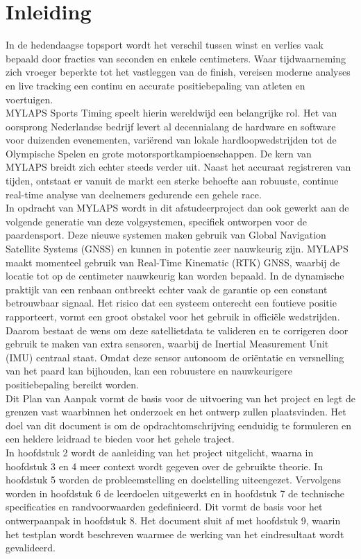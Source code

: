 
\section{Inleiding}
In de hedendaagse topsport wordt het verschil tussen winst en verlies vaak bepaald door fracties van seconden en enkele centimeters. Waar tijdwaarneming zich vroeger beperkte tot het vastleggen van de finish, vereisen moderne analyses en live tracking een continu en accurate positiebepaling van atleten en voertuigen. \\

MYLAPS Sports Timing speelt hierin wereldwijd een belangrijke rol. Het van oorsprong Nederlandse bedrijf levert al decennialang de hardware en software voor duizenden evenementen, variërend van lokale hardloopwedstrijden tot de Olympische Spelen en grote motorsportkampioenschappen. De kern van MYLAPS breidt zich echter steeds verder uit. Naast het accuraat registreren van tijden, ontstaat er vanuit de markt een sterke behoefte aan robuuste, continue real-time analyse van deelnemers gedurende een gehele race. \\

In opdracht van MYLAPS wordt in dit afstudeerproject dan ook gewerkt aan de volgende generatie van deze volgsystemen, specifiek ontworpen voor de paardensport. Deze nieuwe systemen maken gebruik van Global Navigation Satellite Systems (GNSS) en kunnen in potentie zeer nauwkeurig zijn. MYLAPS maakt momenteel gebruik van Real-Time Kinematic (RTK) GNSS, waarbij de locatie tot op de centimeter nauwkeurig kan worden bepaald. In de dynamische praktijk van een renbaan ontbreekt echter vaak de garantie op een constant betrouwbaar signaal. Het risico dat een systeem onterecht een foutieve positie rapporteert, vormt een groot obstakel voor het gebruik in officiële wedstrijden. Daarom bestaat de wens om deze satellietdata te valideren en te corrigeren door gebruik te maken van extra sensoren, waarbij de Inertial Measurement Unit (IMU) centraal staat. Omdat deze sensor autonoom de oriëntatie en versnelling van het paard kan bijhouden, kan een robuustere en nauwkeurigere positiebepaling bereikt worden. \\

Dit Plan van Aanpak vormt de basis voor de uitvoering van het project en legt de grenzen vast waarbinnen het onderzoek en het ontwerp zullen plaatsvinden. Het doel van dit document is om de opdrachtomschrijving eenduidig te formuleren en een heldere leidraad te bieden voor het gehele traject. \\ 

In hoofdstuk 2 wordt de aanleiding van het project uitgelicht, waarna in hoofdstuk 3 en 4 meer context wordt gegeven over de gebruikte theorie. In hoofdstuk 5 worden de probleemstelling en doelstelling uiteengezet. Vervolgens worden in hoofdstuk 6 de leerdoelen uitgewerkt en in hoofdstuk 7 de technische specificaties en randvoorwaarden gedefinieerd. Dit vormt de basis voor het ontwerpaanpak in hoofdstuk 8. Het document sluit af met hoofdstuk 9, waarin het testplan wordt beschreven waarmee de werking van het eindresultaat wordt gevalideerd.



\newpage